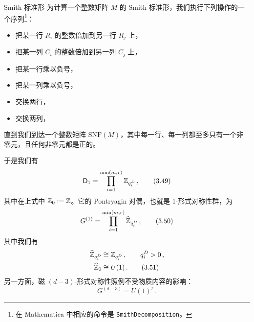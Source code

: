 \begin{notebox}{Smith 标准形}
为计算一个整数矩阵 $M$ 的 Smith 标准形，我们执行下列操作的一个序列\footnote{在 Mathematica 中相应的命令是 \texttt{SmithDecomposition}。}：
\begin{itemize}[leftmargin=1.4em,itemsep=1pt,topsep=1pt]
\item 把某一行 $R_i$ 的整数倍加到另一行 $R_j$ 上，
\item 把某一列 $C_i$ 的整数倍加到另一列 $C_j$ 上，
\item 把某一行乘以负号，
\item 把某一列乘以负号，
\item 交换两行，
\item 交换两列，
\end{itemize}
直到我们到达一个整数矩阵 $\mathrm{SNF}(M)$，其中每一行、每一列都至多只有一个非零元，且任何非零元都是正的。
\end{notebox}

于是我们有
\begin{equation}
  \mathsf{D}_1=\prod_{i=1}^{\min(m,r)}\mathbb{Z}_{q_i^D}\,, \tag{3.49}
\end{equation}
其中在上式中 $\mathbb{Z}_0:=\mathbb{Z}$。它的 Pontryagin 对偶，也就是 1-形式对称性群，为
\begin{equation}
  G^{(1)}=\prod_{i=1}^{\min(m,r)}\widehat{\mathbb{Z}}_{q_i^D}\,, \tag{3.50}
\end{equation}
其中我们有
\begin{align}
  \widehat{\mathbb{Z}}_{q_i^D}&\cong\mathbb{Z}_{q_i^D}\,,\qquad q_i^D>0\,,\nonumber\\
  \widehat{\mathbb{Z}}_0&\cong U(1)\,. \tag{3.51}
\end{align}
另一方面，磁 $(d-3)$-形式对称性照例不受物质内容的影响：
\begin{equation}
  G^{(d-3)}=U(1)^r\,. \tag{3.52}
\end{equation}


